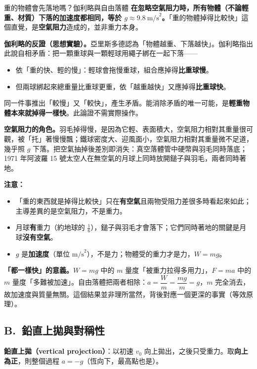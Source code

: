 \documentclass[11pt]{article}
\begin{document}
\begin{補充框}{重的物體會先落地嗎？伽利略與自由落體}
\textbf{在忽略空氣阻力時，所有物體（不論輕重、材質）下落的加速度都相同，等於 $g\approx 9.8\ \text{m/s}^2$。}「重的物體掉得比較快」這個直覺，是\textbf{空氣阻力}造成的，並非重力本身。

\textbf{伽利略的反證（思想實驗）。}亞里斯多德認為「物體越重、下落越快」。伽利略指出此說自相矛盾：把一顆重球與一顆輕球用繩子綁在一起下落——
\begin{itemize}\setlength{\itemsep}{1pt}
\item 依「重的快、輕的慢」：輕球會拖慢重球，組合應掉得\textbf{比重球慢}。
\item 但兩球綁起來總重量比重球更重，依「越重越快」又應掉得\textbf{比重球快}。
\end{itemize}
同一件事推出「較慢」又「較快」，產生矛盾。能消除矛盾的唯一可能，是\textbf{輕重物體本來就掉得一樣快}。此論證不需實際操作。

\textbf{空氣阻力的角色。}羽毛掉得慢，是因為它輕、表面積大，空氣阻力相對其重量很可觀，被「托」著慢慢飄；鐵球密度大、迎風面小，空氣阻力相對其重量微不足道，幾乎照 $g$ 下落。把空氣抽掉後差別即消失：真空落體管中硬幣與羽毛同時落底；1971 年阿波羅 15 號太空人在無空氣的月球上同時放開鎚子與羽毛，兩者同時著地。

\textbf{注意：}
\begin{itemize}\setlength{\itemsep}{1pt}
\item 「重的東西就是掉得比較快」只在\textbf{有空氣}且兩物受阻力差很多時看起來如此；主導差異的是空氣阻力，不是重力。
\item 月球\textbf{有}重力（約地球的 $\tfrac16$），鎚子與羽毛才會落下；它們同時著地的關鍵是月球\textbf{沒有空氣}。
\item $g$ 是\textbf{加速度}（單位 $\text{m/s}^2$），不是力；物體受的重力才是力，$W=mg$。
\end{itemize}

\textbf{「都一樣快」的意義。}$W=mg$ 中的 $m$ 量度「被重力拉得多用力」，$F=ma$ 中的 $m$ 量度「多難被加速」。自由落體把兩者相除：$a=\dfrac{W}{m}=\dfrac{mg}{m}=g$，$m$ 完全消去，故加速度與質量無關。這個結果並非理所當然，背後對應一個更深的事實（等效原理）。
\end{補充框}

\subsection*{\sffamily B.\ 鉛直上拋與對稱性}

\textbf{鉛直上拋（vertical projection）}：以初速 $v_0$ 向上拋出，之後只受重力。取\textbf{向上為正}，則整個過程 $a=-g$（恆向下，最高點也是）。
\end{document}
